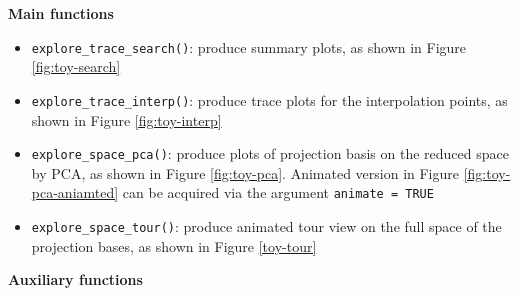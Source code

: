 \documentclass[12pt]{article}
\providecommand{\tightlist}{%
  \setlength{\itemsep}{0pt}\setlength{\parskip}{0pt}}
\begin{document}
\textbf{Main functions}

\begin{itemize}
\tightlist
\item
  \texttt{explore\_trace\_search()}: produce summary plots, as shown in Figure \ref{fig:toy-search}
\item
  \texttt{explore\_trace\_interp()}: produce trace plots for the interpolation points, as shown in Figure \ref{fig:toy-interp}
\item
  \texttt{explore\_space\_pca()}: produce plots of projection basis on the reduced space by PCA, as shown in Figure \ref{fig:toy-pca}. Animated version in Figure \ref{fig:toy-pca-aniamted} can be acquired via the argument \texttt{animate\ =\ TRUE}
\item
  \texttt{explore\_space\_tour()}: produce animated tour view on the full space of the projection bases, as shown in Figure \ref{toy-tour}
\end{itemize}

\textbf{Auxiliary functions}
\end{document}
